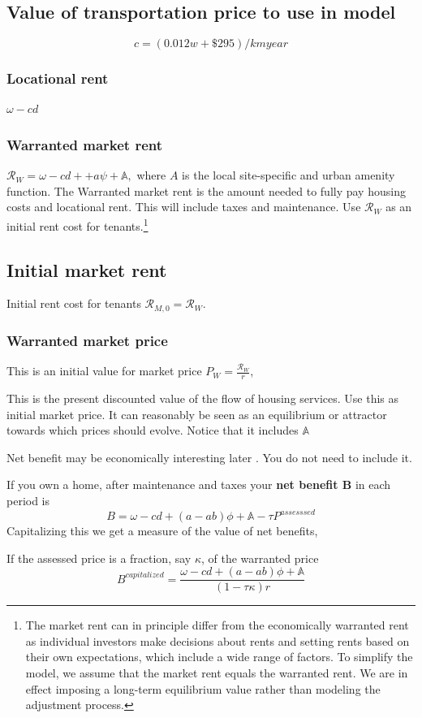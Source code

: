 \subsection{Value of transportation price to use in model}
\[ {c}=(0.012 w+ \$295)/km year \]




\subsubsection{Locational rent}  $\omega-cd$ 

\subsubsection{Warranted market rent} $\mathcal{R}_W = \omega - cd+ + a\psi + \mathbb{A},$
where $A$ is the local site-specific and urban amenity function. The Warranted \gls{market rent} is the amount needed to fully pay housing costs and locational rent. This will include taxes and maintenance. Use  $\mathcal{R}_W$ as an initial rent cost for tenants.\footnote{The market rent can in principle differ from the economically warranted rent as individual investors make decisions about rents and setting rents based on their own expectations, which include a wide range of factors. To simplify the model, we assume that the market rent equals the warranted rent. We are in effect imposing a long-term equilibrium value rather than modeling the adjustment process.} 

\subsection{Initial market rent} 
Initial rent cost for tenants  $\mathcal{R}_{M, 0}= \mathcal{R}_W$.

\subsubsection{Warranted market price}  
This is  an initial value for market price 
 $P_W=\frac{\mathcal{R}_W }{r}$,  

This is the present discounted value of the flow of housing services.  Use this as initial market price.  It can reasonably be seen as an equilibrium or attractor towards which prices should  evolve.  Notice that it includes $\mathbb{A}$

{\color{red}
Net benefit may be economically interesting later . You do not need to include it. 

If you own a home, after maintenance and taxes your \textbf{net benefit B} in each period is 
\[B= \omega-cd +(a-ab)\phi +\mathbb{A} - \tau P^{assesssed}\]
Capitalizing this we get a measure of the value of net benefits, 

If the assessed price is a fraction, say $\kappa$,  of the warranted price
\[B^{capitalized}=\frac{\omega-cd +(a-ab)\phi + \mathbb{A}}{(1- \tau\kappa)r}\]
}
